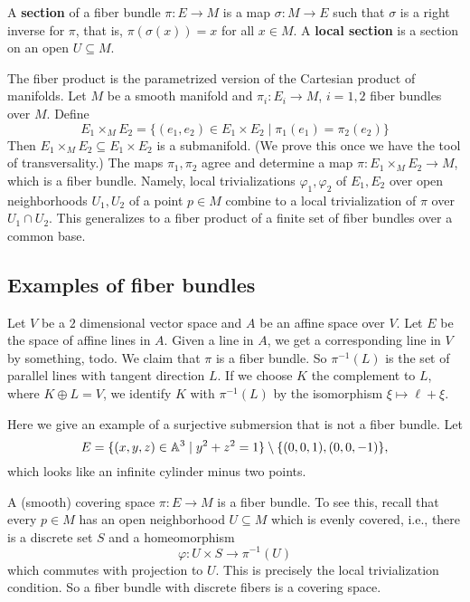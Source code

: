 \begin{definition}[]
    A \textbf{section} of a fiber bundle $\pi\colon E \to M$ is a map $\sigma \colon M \to E$ such that $\sigma$ is a right inverse for $\pi$, that is, $\pi(\sigma(x))=x$ for all $x \in M$. A \textbf{local section} is a section on an open $U \subseteq M$.
\end{definition}
\begin{definition}
    The fiber product is the parametrized version of the Cartesian product of manifolds. Let $M$ be a smooth manifold and $\pi_i \colon E_i  \to M$, $i=1,2$ fiber bundles over $M$. Define \[
        E_1 \times_M E_2= \{(e_1,e_2) \in E_1 \times E_2 \mid \pi_1(e_1)=\pi_2(e_2)\} 
    \] Then $E_1 \times _M E_2 \subseteq E_1 \times  E_2$ is a submanifold. (We prove this once we have the tool of transversality.) The maps $\pi_1,\pi_2$ agree and determine a map $\pi \colon E_1 \times _M E_2 \to M$, which is a fiber bundle. Namely, local trivializations $\varphi_1,\varphi_2  $ of $E_1,E_2$ over open neighborhoods $U_1,U_2$ of a point $p \in M$ combine to a local trivialization of $\pi$ over $U_1 \cap U_2$. This generalizes to a fiber product of a finite set of fiber bundles over a common base.
\end{definition}

\subsection{Examples of fiber bundles}

\begin{example}
    Let $V$ be a $2$ dimensional vector space and $A$ be an affine space over $V$. Let $E$ be the space of affine lines in $A$. Given a line in $A$, we get a corresponding line in $V $ by {\color{burntorange}something, todo}. We claim that $\pi$ is a fiber bundle. So $\pi ^{-1}(L)$ is the set of parallel lines with tangent direction $L$. If we choose $K$ the complement to $L$, where $K\oplus L=V$, we identify $K$ with $\pi ^{-1}(L)$ by the isomorphism $\xi \mapsto  \ell + \xi$.
\end{example}
\begin{example}
    Here we give an example of a surjective submersion that is not a fiber bundle. Let \[
        E= \{(x,y,z) \in \mathbb{A}^3 \mid y^2+z^2=1\} \setminus \{(0,0,1),(0,0,-1)\} ,
    \] which looks like an infinite cylinder minus two points.
\end{example}
\begin{example}
    A (smooth) covering space $\pi \colon E \to M$ is a fiber bundle. To see this, recall that every $p \in M$ has an open neighborhood $U \subseteq M$ which is evenly covered, i.e., there is a discrete set $S$ and a homeomorphism \[
        \varphi  \colon U\times S \to \pi ^{-1}(U)
    \] which commutes with projection to $U$. This is precisely the local trivialization condition. So a fiber bundle with discrete fibers is a covering space.
\end{example}

